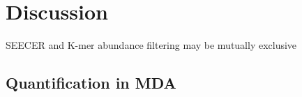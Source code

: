 \section{Discussion}

SEECER and K-mer abundance filtering may be mutually exclusive

\subsection{Quantification in MDA}









